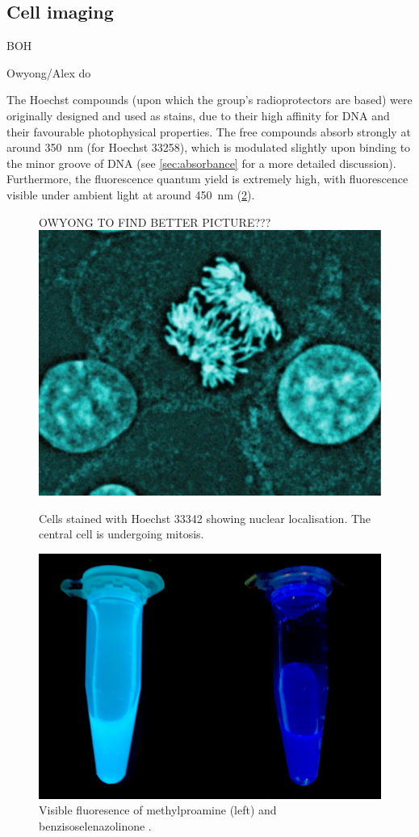\begin{refsection}
\section{Cell imaging}

BOH

Owyong/Alex do

The Hoechst compounds (upon which the group's radioprotectors are based) were originally designed and used as stains, due to their high affinity for DNA and their favourable photophysical properties.\autocite{???}
The free compounds absorb strongly at around 350~nm (for Hoechst 33258), which is modulated slightly upon binding to the minor groove of DNA (see \cref{sec:absorbance} for a more detailed discussion).
Furthermore, the fluorescence quantum yield is extremely high, with fluorescence visible under ambient light at around 450~nm (\cref{fig:hoechst-fluorescence}).

\begin{figure}
    \centering
    OWYONG TO FIND BETTER PICTURE???
    \includegraphics[width=0.6\linewidth]{Figures/hoechst-cells.pdf}
    \caption{Cells stained with Hoechst 33342 showing nuclear localisation. The central cell is undergoing mitosis.}
    \label{fig:hoechst-cells}
\end{figure}

\begin{figure}
    \centering
    \includegraphics[width=0.6\linewidth]{Figures/hoechst-fluoresence.jpg}
    \caption{Visible fluoresence of methylproamine (left) and benzisoselenazolinone .}
    \label{fig:hoechst-fluorescence}
\end{figure}


\end{refsection}
